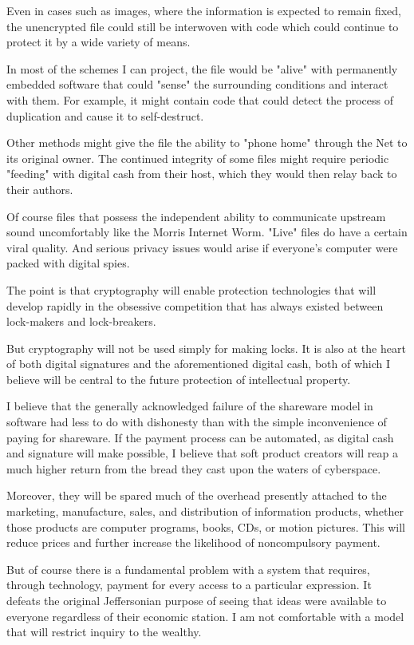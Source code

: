 \documentclass[
]{article}
\begin{document}
Even in cases such as images, where the information is expected to
remain fixed, the unencrypted file could still be interwoven with code
which could continue to protect it by a wide variety of means.

In most of the schemes I can project, the file would be "alive" with
permanently embedded software that could "sense" the surrounding
conditions and interact with them. For example, it might contain code
that could detect the process of duplication and cause it to
self-destruct.

Other methods might give the file the ability to "phone home" through
the Net to its original owner. The continued integrity of some files
might require periodic "feeding" with digital cash from their host,
which they would then relay back to their authors.

Of course files that possess the independent ability to communicate
upstream sound uncomfortably like the Morris Internet Worm. "Live" files
do have a certain viral quality. And serious privacy issues would arise
if everyone's computer were packed with digital spies.

The point is that cryptography will enable protection technologies that
will develop rapidly in the obsessive competition that has always
existed between lock-makers and lock-breakers.

But cryptography will not be used simply for making locks. It is also at
the heart of both digital signatures and the aforementioned digital
cash, both of which I believe will be central to the future protection
of intellectual property.

I believe that the generally acknowledged failure of the shareware model
in software had less to do with dishonesty than with the simple
inconvenience of paying for shareware. If the payment process can be
automated, as digital cash and signature will make possible, I believe
that soft product creators will reap a much higher return from the bread
they cast upon the waters of cyberspace.

Moreover, they will be spared much of the overhead presently attached to
the marketing, manufacture, sales, and distribution of information
products, whether those products are computer programs, books, CDs, or
motion pictures. This will reduce prices and further increase the
likelihood of noncompulsory payment.

But of course there is a fundamental problem with a system that
requires, through technology, payment for every access to a particular
expression. It defeats the original Jeffersonian purpose of seeing that
ideas were available to everyone regardless of their economic station. I
am not comfortable with a model that will restrict inquiry to the
wealthy.
\end{document}
